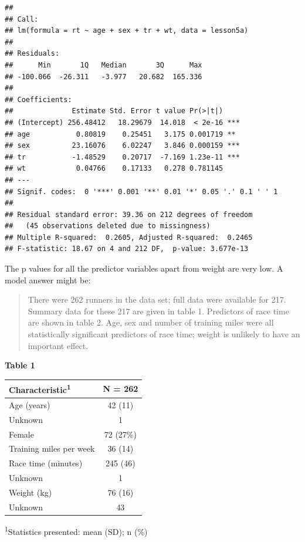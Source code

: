 \documentclass[]{book}
\begin{document}
\begin{verbatim}
## 
## Call:
## lm(formula = rt ~ age + sex + tr + wt, data = lesson5a)
## 
## Residuals:
##      Min       1Q   Median       3Q      Max 
## -100.066  -26.311   -3.977   20.682  165.336 
## 
## Coefficients:
##              Estimate Std. Error t value Pr(>|t|)    
## (Intercept) 256.48412   18.29679  14.018  < 2e-16 ***
## age           0.80819    0.25451   3.175 0.001719 ** 
## sex          23.16076    6.02247   3.846 0.000159 ***
## tr           -1.48529    0.20717  -7.169 1.23e-11 ***
## wt            0.04766    0.17133   0.278 0.781145    
## ---
## Signif. codes:  0 '***' 0.001 '**' 0.01 '*' 0.05 '.' 0.1 ' ' 1
## 
## Residual standard error: 39.36 on 212 degrees of freedom
##   (45 observations deleted due to missingness)
## Multiple R-squared:  0.2605, Adjusted R-squared:  0.2465 
## F-statistic: 18.67 on 4 and 212 DF,  p-value: 3.677e-13
\end{verbatim}

The p values for all the predictor variables apart from weight are very low. A model answer might be:

\begin{quote}
There were 262 runners in the data set; full data were available for 217. Summary data for these 217 are given in table 1. Predictors of race time are shown in table 2. Age, sex and number of training miles were all statistically significant predictors of race time; weight is unlikely to have an important effect.
\end{quote}

\textbf{Table 1}

\captionsetup[table]{labelformat=empty,skip=1pt}
\begin{longtable}{lc}
\toprule
\textbf{Characteristic}\textsuperscript{1} & \textbf{N = 262} \\ 
\midrule
Age (years) & 42 (11) \\ 
Unknown & 1 \\ 
Female & 72 (27\%) \\ 
Training miles per week & 36 (14) \\ 
Race time (minutes) & 245 (46) \\ 
Unknown & 1 \\ 
Weight (kg) & 76 (16) \\ 
Unknown & 43 \\ 
\bottomrule
\end{longtable}
\vspace{-5mm}
\begin{minipage}{\linewidth}
\textsuperscript{1}Statistics presented: mean (SD); n (\%) \\ 
\end{minipage}
\end{document}
